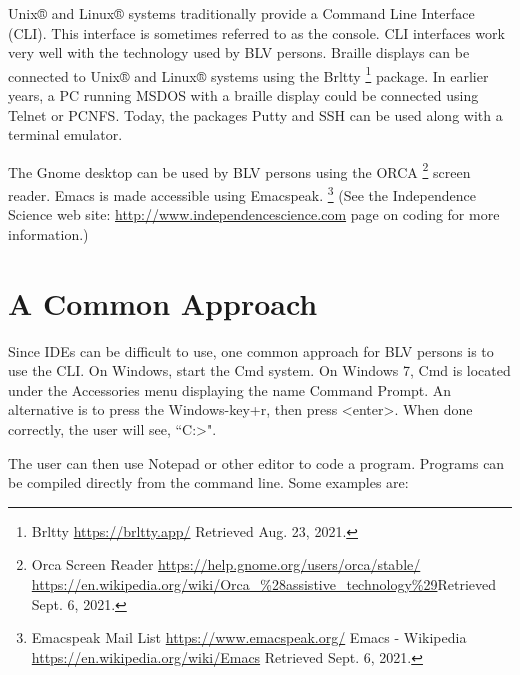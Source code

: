 \documentclass[11.5pt]{sig-alternate}
\begin{document}
\begin{large}
Unix® and Linux® systems traditionally provide a Command Line Interface (CLI). This interface is sometimes referred to as the console. CLI interfaces work very well with the technology used by BLV persons. Braille displays can be connected to Unix® and Linux® systems using the Brltty \footnote{Brltty \url{https://brltty.app/} Retrieved Aug. 23, 2021.} package. In earlier years, a PC running MSDOS with a braille display could be connected using Telnet or PCNFS. Today, the packages Putty and SSH can be used along with a terminal emulator.

The Gnome desktop can be used by BLV persons using the ORCA \footnote{Orca Screen Reader \url{https://help.gnome.org/users/orca/stable/} \url{https://en.wikipedia.org/wiki/Orca_\%28assistive_technology\%29}Retrieved Sept. 6, 2021.} screen reader. Emacs is made accessible using Emacspeak. \footnote{Emacspeak Mail List \url{https://www.emacspeak.org/} Emacs - Wikipedia \url{https://en.wikipedia.org/wiki/Emacs} Retrieved Sept. 6, 2021.} (See the Independence Science web site: \url{http://www.independencescience.com} page on coding for more information.)

\section*{A Common Approach}
Since IDEs can be difficult to use, one common approach for BLV persons is to use the CLI. On Windows, start the Cmd system. On Windows 7, Cmd is located under the Accessories menu displaying the name Command Prompt. An alternative is to press the Windows-key+r, then press <enter>. When done correctly, the user will see, ``C:>".

The user can then use Notepad or other editor to code a program. Programs can be compiled directly from the command line. Some examples are:


\end{large}
\end{document}
